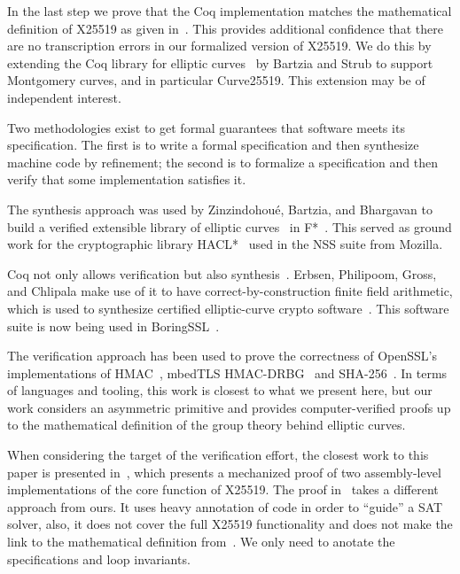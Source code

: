 In the last step we prove that the Coq implementation matches
the mathematical definition of X25519 as given in~\cite[Sec.~2]{Ber06}.
This provides additional confidence that there are no transcription errors
in our formalized version of X25519.
We do this by extending the Coq library
for elliptic curves~\cite{BartziaS14} by Bartzia and Strub to
support Montgomery curves, and in particular Curve25519.
This extension may be of independent interest.

Two methodologies exist to get formal guarantees that software meets its specification.
The first is to write a formal specification and then synthesize
machine code by refinement; the second is to formalize
a specification and then verify that some
implementation satisfies it.

The synthesis approach was used by Zinzindohou{\'{e}}, Bartzia, and Bhargavan to build a verified extensible
library of elliptic curves~\cite{Zinzindohoue2016AVE} in F*~\cite{DBLP:journals/corr/BhargavanDFHPRR17}.
This served as ground work for the cryptographic library HACL*~\cite{zinzindohoue2017hacl}
used in the NSS suite from Mozilla.

Coq not only allows verification but also synthesis~\cite{CpdtJFR}.
Erbsen, Philipoom, Gross, and Chlipala make use of it to have
correct-by-construction finite field arithmetic, which is used
to synthesize certified elliptic-curve crypto software~\cite{Philipoom2018CorrectbyconstructionFF,Erbsen2017CraftingCE,Erbsen2016SystematicSO}.
This software suite is now being used in BoringSSL~\cite{fiat-crypto}.

The verification approach has been used to prove the correctness of OpenSSL's
implementations of HMAC~\cite{Beringer2015VerifiedCA}, mbedTLS HMAC-DRBG~\cite{2017-Ye} and SHA-256~\cite{2015-Appel}.
In terms of languages and tooling, this work is closest to what we present here,
but our work considers an asymmetric primitive and provides computer-verified
proofs up to the mathematical definition of the group theory behind elliptic curves.

When considering the target of the verification effort, the closest work
to this paper is presented in~\cite{Chen2014VerifyingCS}, which presents
a mechanized proof of two assembly-level implementations of the core function
of X25519.
The proof in~\cite{Chen2014VerifyingCS} takes a different approach from ours.
It uses heavy annotation of code in order to ``guide'' a SAT solver,
also, it does not cover the full X25519 functionality and does
not make the link to the mathematical definition from~\cite{Ber06}.
We only need to anotate the specifications and loop invariants.

